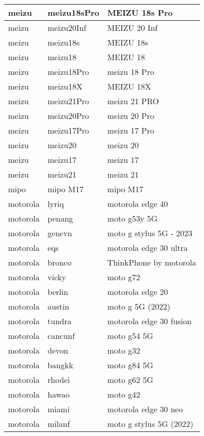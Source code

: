 \begin{tabularx}{\linewidth}{|l|X|X|}
        meizu & meizu18sPro & MEIZU 18s Pro \\ \hline
        meizu & meizu20Inf & MEIZU 20 Inf \\ \hline
        meizu & meizu18s & MEIZU 18s \\ \hline
        meizu & meizu18 & MEIZU 18 \\ \hline
        meizu & meizu18Pro & meizu 18 Pro \\ \hline
        meizu & meizu18X & MEIZU 18X \\ \hline
        meizu & meizu21Pro & meizu 21 PRO \\ \hline
        meizu & meizu20Pro & meizu 20 Pro \\ \hline
        meizu & meizu17Pro & meizu 17 Pro \\ \hline
        meizu & meizu20 & meizu 20 \\ \hline
        meizu & meizu17 & meizu 17 \\ \hline
        meizu & meizu21 & meizu 21 \\ \hline
        mipo & mipo M17 & mipo M17 \\ \hline
        motorola & lyriq & motorola edge 40 \\ \hline
        motorola & penang & moto g53y 5G \\ \hline
        motorola & genevn & moto g stylus 5G - 2023 \\ \hline
        motorola & eqs & motorola edge 30 ultra \\ \hline
        motorola & bronco & ThinkPhone by motorola \\ \hline
        motorola & vicky & moto g72 \\ \hline
        motorola & berlin & motorola edge 20 \\ \hline
        motorola & austin & moto g 5G (2022) \\ \hline
        motorola & tundra & motorola edge 30 fusion \\ \hline
        motorola & cancunf & moto g54 5G \\ \hline
        motorola & devon & moto g32 \\ \hline
        motorola & bangkk & moto g84 5G \\ \hline
        motorola & rhodei & moto g62 5G \\ \hline
        motorola & hawao & moto g42 \\ \hline
        motorola & miami & motorola edge 30 neo \\ \hline
        motorola & milanf & moto g stylus 5G (2022) \\ \hline

\end{tabularx}
